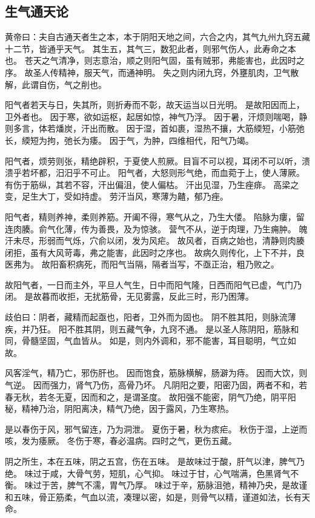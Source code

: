\subsection{生气通天论}

黄帝曰：夫自古通天者生之本，本于阴阳天地之间，六合之内，其气九州九窍五藏十二节，皆通乎天气。
其生五，其气三，数犯此者，则邪气伤人，此寿命之本也。
苍天之气清净，则志意治，顺之则阳气固，虽有贼邪，弗能害也，此因时之序。
故圣人传精神，服天气，而通神明。
失之则内闭九窍，外壅肌肉，卫气散解，此谓自伤，气之削也。

阳气者若天与日，失其所，则折寿而不彰，故天运当以日光明。
是故阳因而上，卫外者也。
因于寒，欲如运枢，起居如惊，神气乃浮。
因于暑，汗烦则喘喝，静则多言，体若燔炭，汗出而散。
因于湿，首如裹，湿热不攘，大筋緛短，小筋弛长，緛短为拘，弛长为痿。
因于气，为肿，四维相代，阳气乃竭。

阳气者，烦劳则张，精绝辟积，于夏使人煎厥。目盲不可以视，耳闭不可以听，溃溃乎若坏都，汨汨乎不可止。
阳气者，大怒则形气绝，而血菀于上，使人薄厥。
有伤于筋纵，其若不容，汗出偏沮，使人偏枯。
汗出见湿，乃生痤痱。
高梁之变，足生大丁，受如持虚。
劳汗当风，寒薄为齄，郁乃痤。

阳气者，精则养神，柔则养筋。开阖不得，寒气从之，乃生大偻。
陷脉为瘻，留连肉腠。俞气化薄，传为善畏，及为惊骇。
营气不从，逆于肉理，乃生痈肿。
魄汗未尽，形弱而气烁，穴俞以闭，发为风疟。
故风者，百病之始也，清静则肉腠闭拒，虽有大风苛毒，弗之能害，此因时之序也。
故病久则传化，上下不并，良医弗为。
故阳畜积病死，而阳气当隔，隔者当写，不亟正治，粗乃败之。

故阳气者，一日而主外，平旦人气生，日中而阳气隆，日西而阳气已虚，气门乃闭。
是故暮而收拒，无扰筋骨，无见雾露，反此三时，形乃困薄。

歧伯曰：阴者，藏精而起亟也，阳者，卫外而为固也。
阴不胜其阳，则脉流薄疾，并乃狂。
阳不胜其阴，则五藏气争，九窍不通。
是以圣人陈阴阳，筋脉和同，骨髓坚固，气血皆从。
如是，则内外调和，邪不能害，耳目聪明，气立如故。

风客淫气，精乃亡，邪伤肝也。
因而饱食，筋脉横解，肠澼为痔。
因而大饮，则气逆。
因而强力，肾气乃伤，高骨乃坏。
凡阴阳之要，阳密乃固，两者不和，若春无秋，若冬无夏，因而和之，是谓圣度。
故阳强不能密，阴气乃绝，阴平阳秘，精神乃治，阴阳离决，精气乃绝，因于露风，乃生寒热。

是以春伤于风，邪气留连，乃为洞泄。
夏伤于暑，秋为痎疟。
秋伤于湿，上逆而咳，发为痿厥。
冬伤于寒，春必温病。四时之气，更伤五藏。

阴之所生，本在五味，阴之五宫，伤在五味。
是故味过于酸，肝气以津，脾气乃绝。
味过于咸，大骨气劳，短肌，心气抑。
味过于甘，心气喘满，色黑肾气不衡。
味过于苦，脾气不濡，胃气乃厚。
味过于辛，筋脉沮弛，精神乃央，是故谨和五味，骨正筋柔，气血以流，凑理以密，如是，则骨气以精，谨道如法，长有天命。
